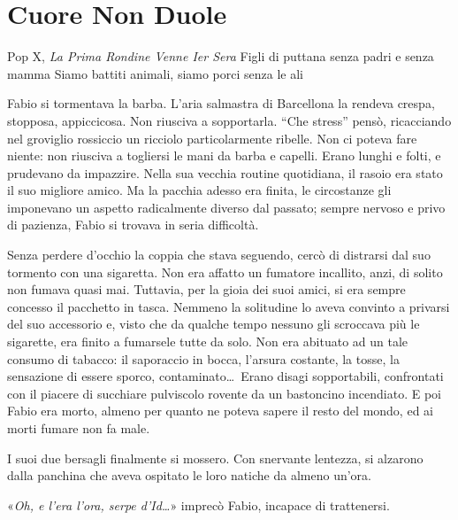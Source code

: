 \chapter{Cuore Non Duole}

\begin{chapquote}{Pop X, \textit{La Prima Rondine Venne Ier Sera}}
	Figli di puttana senza padri e senza mamma\newline
	Siamo battiti animali, siamo porci senza le ali
\end{chapquote}


Fabio si tormentava la barba. L'aria salmastra di Barcellona la rendeva crespa, stopposa, appiccicosa. Non riusciva a sopportarla. ``Che stress'' pensò, ricacciando nel groviglio rossiccio un ricciolo particolarmente ribelle. Non ci poteva fare niente: non riusciva a togliersi le mani da barba e capelli. Erano lunghi e folti, e prudevano da impazzire. Nella sua vecchia routine quotidiana, il rasoio era stato il suo migliore amico. Ma la pacchia adesso era finita, le circostanze gli imponevano un aspetto radicalmente diverso dal passato; sempre nervoso e privo di pazienza, Fabio si trovava in seria difficoltà.

Senza perdere d'occhio la coppia che stava seguendo, cercò di distrarsi dal suo tormento con una sigaretta. Non era affatto un fumatore incallito, anzi, di solito non fumava quasi mai. Tuttavia, per la gioia dei suoi amici, si era sempre concesso il pacchetto in tasca. Nemmeno la solitudine lo aveva convinto a privarsi del suo accessorio e, visto che da qualche tempo nessuno gli scroccava più le sigarette, era finito a fumarsele tutte da solo. Non era abituato ad un tale consumo di tabacco: il saporaccio in bocca, l'arsura costante, la tosse, la sensazione di essere sporco, contaminato\ldots\ Erano disagi sopportabili, confrontati con il piacere di succhiare pulviscolo rovente da un bastoncino incendiato. E poi Fabio era morto, almeno per quanto ne poteva sapere il resto del mondo, ed ai morti fumare non fa male.

I suoi due bersagli finalmente si mossero. Con snervante lentezza, si alzarono dalla panchina che aveva ospitato le loro natiche da almeno un'ora.

«\textit{Oh, e l'era l'ora, serpe d'Id\ldots}» imprecò Fabio, incapace di trattenersi.

